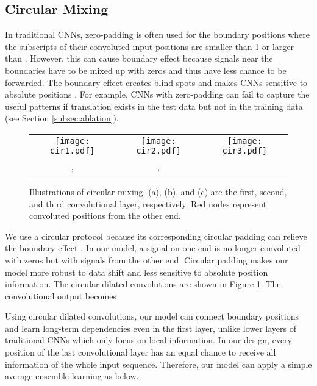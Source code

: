 \documentclass{article}
\begin{document}
\subsection{Circular Mixing}
\label{subsec:circular}

In traditional CNNs, zero-padding is often used for the boundary positions where the subscripts of their convoluted input positions  are smaller than 1 or larger than . However, this can cause boundary effect because signals near the boundaries have to be mixed up with zeros and thus have less chance to be forwarded. The boundary effect creates blind spots and makes CNNs sensitive to absolute positions \cite{kayhan2020translation, alsallakh2020mind}. For example, CNNs with zero-padding can fail to capture the useful patterns if translation exists in the test data but not in the training data (see Section \ref{subsec:ablation}).

\begin{figure}[tb]
	\centering
	\begin{tabular}{ccc}
     \texttt{[image: cir1.pdf]}
    &\texttt{[image: cir2.pdf]}
    &\texttt{[image: cir3.pdf]}\\
    , &, &\\
    \end{tabular}
	\caption{Illustrations of circular mixing. (a), (b), and (c) are the first, second, and third convolutional layer, respectively. Red nodes represent convoluted positions from the other end.}
	\label{fig:cir}
\end{figure}

We use a circular protocol because its corresponding circular padding can relieve the boundary effect \cite{kayhan2020translation, alsallakh2020mind}. In our model, a signal on one end is no longer convoluted with zeros but with signals from the other end.
Circular padding makes our model more robust to data shift and less sensitive to absolute position information.
The circular dilated convolutions are shown in Figure \ref{fig:cir}. The convolutional output  becomes

Using circular dilated convolutions, our model can connect boundary positions and learn long-term dependencies even in the first layer, unlike lower layers of traditional CNNs which only focus on local information. In our design, every position of the last convolutional layer has an equal chance to receive all information of the whole input sequence. Therefore, our model can apply a simple average ensemble learning as below.
\end{document}
